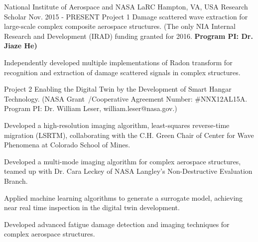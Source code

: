 

\begin{cventries}

  \cventryprojtrueb
    {National Institute of Aerospace and NASA LaRC} %
    {Hampton, VA, USA} %
    {Research Scholar} %
    {Nov. 2015 - PRESENT} %
    {Project 1} %
    {{Damage scattered wave extraction for large-scale complex composite aerospace structures.} (The only NIA Internal Research and Development (IRAD) funding granted for 2016. \bfseries{Program PI: Dr. Jiaze He})}
    {     
     \begin{cvitems} %
       \item {Independently developed multiple implementations of Radon transform for recognition and extraction of damage scattered signals in complex structures.}
      \end{cvitems}
         }
  \cventryprojtruec
   {Project 2} %
   {{Enabling the Digital Twin by the Development of Smart Hangar Technology.} (NASA Grant\ /Cooperative Agreement Number: \#NNX12AL15A. Program PI: Dr. William Leser, william.leser@nasa.gov.)}
    {     
     \begin{cvitems} %
       \item {Developed a high-resolution imaging algorithm, least-squares reverse-time migration (LSRTM), collaborating with the C.H. Green Chair of Center for Wave Phenomena at Colorado School of Mines. }
       \item {Developed a multi-mode imaging algorithm for complex aerospace structures, teamed up with Dr. Cara Leckey of NASA Langley's Non-Destructive Evaluation Branch.}
       \item {Applied machine learning algorithms to generate a surrogate model, achieving near real time inspection in the digital twin development.}
       \item {Developed advanced fatigue damage detection and imaging techniques for complex aerospace structures.}
      \end{cvitems}
         }


\end{cventries}
